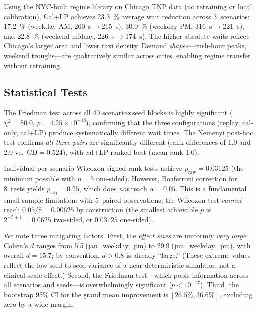 \documentclass[conference,10pt]{IEEEtran}
\begin{document}
Using the NYC-built regime library on Chicago TNP data (no retraining
or local calibration), Cal+LP achieves \SI{23.3}{\percent} average
wait reduction across 3~scenarios: \SI{17.2}{\percent} (weekday AM,
\SI{260}{\second}$\to$\SI{215}{\second}), \SI{30.0}{\percent}
(weekday PM, \SI{316}{\second}$\to$\SI{221}{\second}), and
\SI{22.8}{\percent} (weekend midday,
\SI{226}{\second}$\to$\SI{174}{\second}). The higher absolute
waits reflect Chicago's larger area and lower taxi density. Demand
\emph{shapes}---rush-hour peaks, weekend troughs---are qualitatively
similar across cities, enabling regime transfer without retraining.

\subsection{Statistical Tests}

The Friedman test across all 40 scenario$\times$seed blocks is
highly significant ($\chi^2 = 80.0$, $p = 4.25 \times 10^{-18}$),
confirming that the three configurations (replay, cal-only, cal+LP)
produce systematically different wait times. The Nemenyi post-hoc
test confirms \emph{all three pairs} are significantly different
(rank differences of 1.0 and 2.0 vs.\ CD${}= 0.524$), with cal+LP
ranked best (mean rank 1.0).

Individual per-scenario Wilcoxon signed-rank tests achieve
$p_\text{raw} = 0.03125$ (the minimum possible with $n=5$ one-sided).
However, Bonferroni correction for 8~tests yields
$p_\text{adj} = 0.25$, which does \emph{not} reach $\alpha = 0.05$.
This is a fundamental small-sample limitation: with 5~paired
observations, the Wilcoxon test \emph{cannot} reach $0.05/8 = 0.00625$
by construction (the smallest achievable $p$ is $2^{-5+1} = 0.0625$
two-sided, or $0.03125$ one-sided).

We note three mitigating factors. First, the \emph{effect sizes} are
uniformly \emph{very large}: Cohen's $d$ ranges from 5.5
(jan\_weekday\_pm) to 29.9 (jun\_weekday\_pm), with overall $d = 15.7$;
by convention, $d > 0.8$ is already ``large.'' (These extreme values
reflect the low seed-to-seed variance of a near-deterministic
simulator, not a clinical-scale effect.)
Second, the Friedman test---which pools information across all
scenarios and seeds---is overwhelmingly significant ($p < 10^{-17}$).
Third, the bootstrap 95\% CI for the grand mean improvement is
$[26.5\%, 36.6\%]$, excluding zero by a wide margin.


\end{document}
